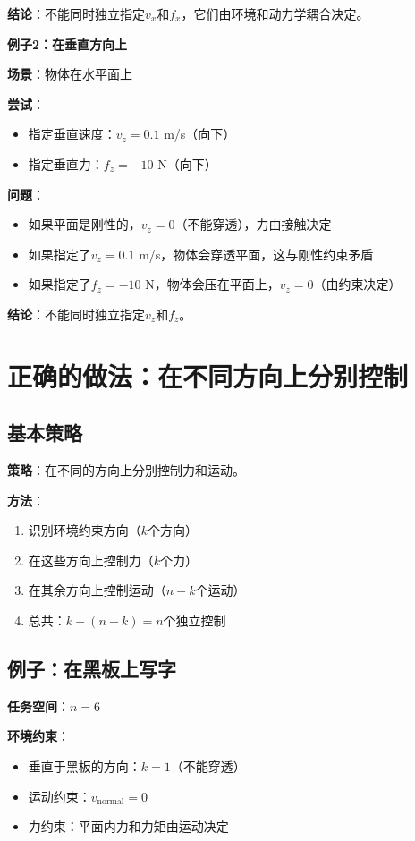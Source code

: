 \documentclass[12pt,a4paper]{article}
\begin{document}
\textbf{结论}：不能同时独立指定$v_x$和$f_x$，它们由环境和动力学耦合决定。

\textbf{例子2：在垂直方向上}

\textbf{场景}：物体在水平面上

\textbf{尝试}：
\begin{itemize}
\item 指定垂直速度：$v_z = 0.1$ m/s（向下）
\item 指定垂直力：$f_z = -10$ N（向下）
\end{itemize}

\textbf{问题}：
\begin{itemize}
\item 如果平面是刚性的，$v_z = 0$（不能穿透），力由接触决定
\item 如果指定了$v_z = 0.1$ m/s，物体会穿透平面，这与刚性约束矛盾
\item 如果指定了$f_z = -10$ N，物体会压在平面上，$v_z = 0$（由约束决定）
\end{itemize}

\textbf{结论}：不能同时独立指定$v_z$和$f_z$。

\section{正确的做法：在不同方向上分别控制}

\subsection{基本策略}

\textbf{策略}：在不同的方向上分别控制力和运动。

\textbf{方法}：
\begin{enumerate}
\item 识别环境约束方向（$k$个方向）
\item 在这些方向上控制力（$k$个力）
\item 在其余方向上控制运动（$n-k$个运动）
\item 总共：$k + (n-k) = n$个独立控制
\end{enumerate}

\subsection{例子：在黑板上写字}

\textbf{任务空间}：$n = 6$

\textbf{环境约束}：
\begin{itemize}
\item 垂直于黑板的方向：$k = 1$（不能穿透）
\item 运动约束：$v_{\text{normal}} = 0$
\item 力约束：平面内力和力矩由运动决定
\end{itemize}
\end{document}
